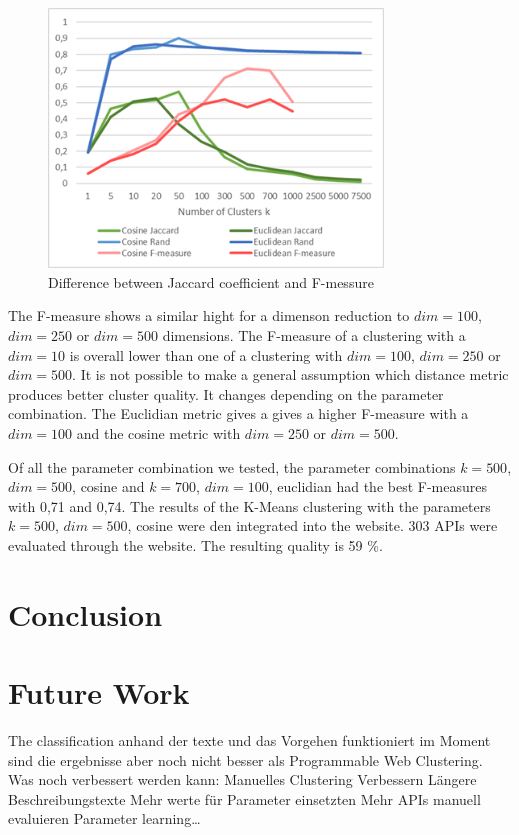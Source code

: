 \documentclass[a4paper]{IEEEtran}
\begin{document}
\begin{figure}[!t]
\centering
\includegraphics[width= 3.5in]{img/Jaccard.png}
\caption{Difference between Jaccard coefficient and F-messure}
\label{fig_sim}
\end{figure}

The F-measure shows a similar hight for a dimenson reduction to $dim⁡= 100$, $dim⁡= 250$ or $dim⁡= 500$ dimensions. The F-measure of a clustering with a $dim=10$ is overall lower than one of a clustering with $dim⁡= 100$, $dim⁡= 250$ or $dim⁡= 500$. 
It is not possible to make a general assumption which distance metric produces better cluster quality. It changes depending on the parameter combination. The Euclidian metric gives a gives a higher F-measure with a $dim⁡= 100$ and the cosine metric with $dim⁡= 250$ or $dim⁡= 500$.

Of all the parameter combination we tested, the parameter combinations $k⁡= 500$, $dim⁡= 500$, cosine and $k⁡= 700$, $dim⁡= 100$, euclidian had the best F-measures with 0,71 and 0,74.
The results of the K-Means clustering with the parameters $k⁡= 500$, $dim⁡= 500$, cosine were den integrated into the website. 303 APIs were evaluated through the website. The resulting quality is 59 \%.

\section{Conclusion}

\section{Future Work}
The classification anhand der texte und das Vorgehen funktioniert im Moment sind die ergebnisse aber noch nicht besser als Programmable Web Clustering. Was noch verbessert werden kann: 
Manuelles Clustering Verbessern
Längere Beschreibungstexte
Mehr werte für Parameter einsetzten
Mehr APIs manuell evaluieren
Parameter learning… 


\newpage







\end{document}
